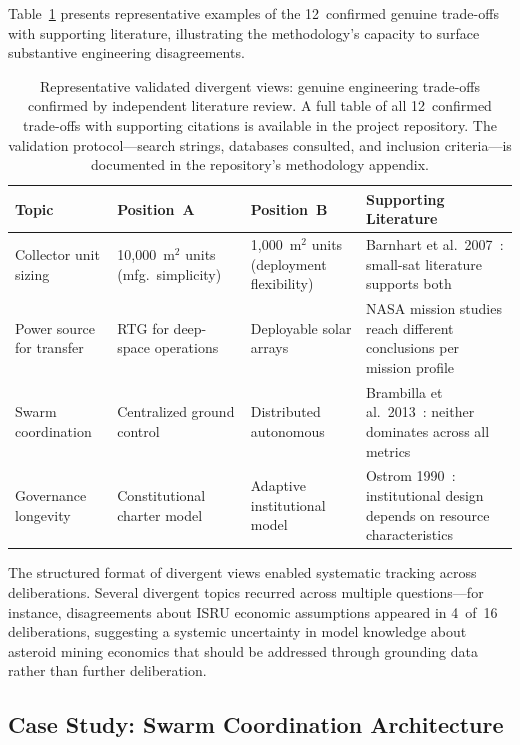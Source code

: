 \documentclass[11pt,a4paper]{article}
\begin{document}
Table~\ref{tab:validated_divergent} presents representative examples of the 12~confirmed genuine trade-offs with supporting literature, illustrating the methodology's capacity to surface substantive engineering disagreements.

\begin{table}[ht]
\centering
\caption{Representative validated divergent views: genuine engineering trade-offs confirmed by independent literature review. A full table of all 12~confirmed trade-offs with supporting citations is available in the project repository. The validation protocol---search strings, databases consulted, and inclusion criteria---is documented in the repository's methodology appendix.}
\label{tab:validated_divergent}
\begin{tabular}{@{}p{2.2cm}p{3.2cm}p{3.2cm}p{4cm}@{}}
\toprule
\textbf{Topic} & \textbf{Position~A} & \textbf{Position~B} & \textbf{Supporting Literature} \\
\midrule
Collector unit sizing & 10{,}000~m$^2$ units (mfg.\ simplicity) & 1{,}000~m$^2$ units (deployment flexibility) & Barnhart et al.\ 2007~\cite{barnhart2007smallsat}: small-sat literature supports both \\
Power source for transfer & RTG for deep-space operations & Deployable solar arrays & NASA mission studies reach different conclusions per mission profile~\cite{nasa2020se} \\
Swarm coordination & Centralized ground control & Distributed autonomous & Brambilla et al.\ 2013~\cite{brambilla2013swarm}: neither dominates across all metrics \\
Governance longevity & Constitutional charter model & Adaptive institutional model & Ostrom 1990~\cite{ostrom1990governing}: institutional design depends on resource characteristics \\
\bottomrule
\end{tabular}
\end{table}

The structured format of divergent views enabled systematic tracking across deliberations. Several divergent topics recurred across multiple questions---for instance, disagreements about ISRU economic assumptions appeared in 4~of~16 deliberations, suggesting a systemic uncertainty in model knowledge about asteroid mining economics that should be addressed through grounding data rather than further deliberation.

\subsection{Case Study: Swarm Coordination Architecture}
\end{document}
